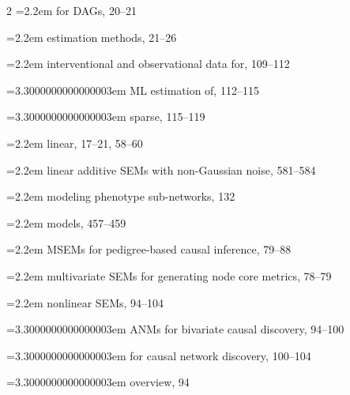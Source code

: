 \begin{multicols}{2}
\noindent\hangindent=2.2em \hspace*{1.1em}for DAGs, 20--21\par
\noindent\hangindent=2.2em \hspace*{1.1em}estimation methods, 21--26\par
\noindent\hangindent=2.2em \hspace*{1.1em}interventional and observational data for, 109--112\par
\noindent\hangindent=3.3000000000000003em \hspace*{2.2em}ML estimation of, 112--115\par
\noindent\hangindent=3.3000000000000003em \hspace*{2.2em}sparse, 115--119\par
\noindent\hangindent=2.2em \hspace*{1.1em}linear, 17--21, 58--60\par
\noindent\hangindent=2.2em \hspace*{1.1em}linear additive SEMs with non-Gaussian noise, 581--584\par
\noindent\hangindent=2.2em \hspace*{1.1em}modeling phenotype sub-networks, 132\par
\noindent\hangindent=2.2em \hspace*{1.1em}models, 457--459\par
\noindent\hangindent=2.2em \hspace*{1.1em}MSEMs for pedigree-based causal inference, 79--88\par
\noindent\hangindent=2.2em \hspace*{1.1em}multivariate SEMs for generating node core metrics, 78--79\par
\noindent\hangindent=2.2em \hspace*{1.1em}nonlinear SEMs, 94--104\par
\noindent\hangindent=3.3000000000000003em \hspace*{2.2em}ANMs for bivariate causal discovery, 94--100\par
\noindent\hangindent=3.3000000000000003em \hspace*{2.2em}for causal network discovery, 100--104\par
\noindent\hangindent=3.3000000000000003em \hspace*{2.2em}overview, 94\par

\end{multicols}
